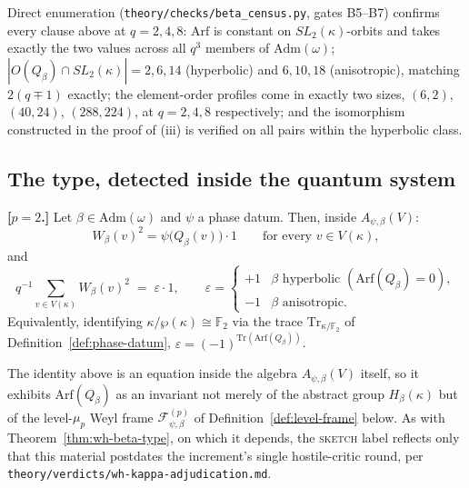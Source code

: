 \begin{remark}
Direct enumeration (\texttt{theory\slash{}checks\slash{}beta\_census.py}, gates B5--B7)
confirms every clause above at $q=2,4,8$: $\mathrm{Arf}$ is constant on
$SL_2(\kappa)$-orbits and takes exactly the two values across all $q^3$
members of $\mathrm{Adm}(\omega)$; $|O(Q_\beta)\cap SL_2(\kappa)|=2,6,14$
(hyperbolic) and $6,10,18$ (anisotropic), matching $2(q\mp 1)$ exactly; the
element-order profiles come in exactly two sizes, $(6,2)$, $(40,24)$,
$(288,224)$, at $q=2,4,8$ respectively; and the isomorphism constructed in
the proof of (iii) is verified on all pairs within the hyperbolic class.
\end{remark}

\subsection{The type, detected inside the quantum system}

\statusSketch
\begin{theorem}
\label{thm:wh-beta-eps}
\textbf{[$p=2$.]} Let $\beta\in\mathrm{Adm}(\omega)$ and $\psi$ a phase
datum. Then, inside $A_{\psi,\beta}(V)$:
\[
W_\beta(v)^2 = \psi\big(Q_\beta(v)\big)\cdot 1 \qquad\text{for every } v\in V(\kappa),
\]
and
\[
q^{-1}\sum_{v\in V(\kappa)} W_\beta(v)^2 \;=\; \varepsilon\cdot 1,
\qquad
\varepsilon = \begin{cases} +1 & \beta \text{ hyperbolic } (\mathrm{Arf}(Q_\beta)=0), \\
-1 & \beta \text{ anisotropic}. \end{cases}
\]
Equivalently, identifying $\kappa/\wp(\kappa)\cong\mathbb{F}_2$ via the trace
$\mathrm{Tr}_{\kappa/\mathbb{F}_2}$ of Definition~\ref{def:phase-datum},
$\varepsilon = (-1)^{\mathrm{Tr}(\mathrm{Arf}(Q_\beta))}$.
\end{theorem}

\begin{scope}
The identity above is an equation inside the algebra $A_{\psi,\beta}(V)$
itself, so it exhibits $\mathrm{Arf}(Q_\beta)$ as an invariant not merely of
the abstract group $H_\beta(\kappa)$ but of the level-$\mu_p$ Weyl frame
$\mathcal{F}^{(p)}_{\psi,\beta}$ of Definition~\ref{def:level-frame} below.
As with Theorem~\ref{thm:wh-beta-type}, on which it depends, the
\textsc{sketch} label reflects only that this material postdates the
increment's single hostile-critic round, per
\texttt{theory\slash{}verdicts\slash{}wh-kappa-adjudication.md}.
\end{scope}

